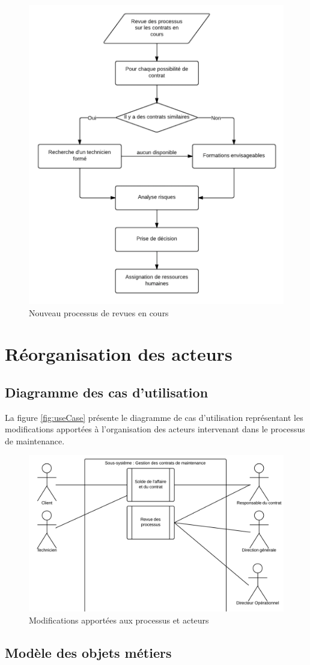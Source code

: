 \begin{figure}[h!]
	\centering
	\includegraphics[width=0.45\linewidth]{images/processus_revues_actuels.png}
	\caption{Nouveau processus de revues en cours}
	\label{fig:processusRevueCours}
\end{figure}


\section{Réorganisation des acteurs}

\subsection{Diagramme des cas d'utilisation}

La figure \vref{fig:useCase} présente le diagramme de cas d'utilisation représentant les modifications apportées à l'organisation des acteurs intervenant dans le processus de maintenance.

\begin{figure}[h!]
	\centering
	\includegraphics[width=0.6\linewidth]{images/useCase.png}
	\caption{Modifications apportées aux processus et acteurs}
	\label{fig:useCase}
\end{figure}

\pagebreak
\subsection{Modèle des objets métiers}

